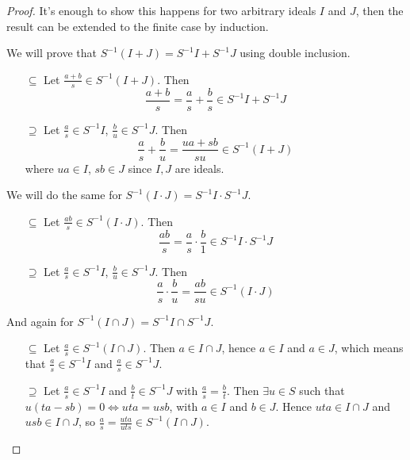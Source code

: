 \begin{exercise}
\begin{enumerate}
    \begin{proof}
    It's enough to show this happens for two arbitrary ideals \(I\) and \(J\), then the result can be extended to the finite case by induction.
    
    We will prove that \(S^{-1} (I + J) = S^{-1} I + S^{-1} J\) using double inclusion.
    \begin{itemize}
        \item[\(\subseteq\)] Let \(\frac{a + b}{s} \in S^{-1}(I + J)\). Then
        \[
            \frac{a + b}{s} = \frac{a}{s} + \frac{b}{s} \in S^{-1} I + S^{-1} J
        \]
        
        \item[\(\supseteq\)] Let \(\frac{a}{s} \in S^{-1} I\), \(\frac{b}{u} \in S^{-1} J\). Then
        \[
            \frac{a}{s} + \frac{b}{u} = \frac{u a + s b}{s u} \in S^{-1} (I + J)
        \]
        where \(ua \in I\), \(sb \in J\) since \(I, J\) are ideals.
    \end{itemize}
    
    We will do the same for \(S^{-1} (I \cdot J) = S^{-1} I \cdot S^{-1} J\).
    \begin{itemize}
        \item[\(\subseteq\)] Let \(\frac{ab}{s} \in S^{-1} (I \cdot J)\). Then
        \[
            \frac{ab}{s} = \frac{a}{s} \cdot \frac{b}{1} \in S^{-1} I \cdot S^{-1} J
        \]
        
        \item[\(\supseteq\)] Let \(\frac{a}{s} \in S^{-1} I\), \(\frac{b}{u} \in S^{-1} J\). Then
        \[
            \frac{a}{s} \cdot \frac{b}{u} = \frac{ab}{su} \in S^{-1} (I \cdot J)
        \]
    \end{itemize}
    
    And again for \(S^{-1} (I \cap J) = S^{-1} I \cap S^{-1} J\).
    \begin{itemize}
        \item[\(\subseteq\)] Let \(\frac{a}{s} \in S^{-1} (I \cap J)\). Then \(a \in I \cap J\), hence \(a \in I\) and \(a \in J\), which means that \(\frac{a}{s} \in S^{-1} I\) and \(\frac{a}{s} \in S^{-1} J\).
        
        \item[\(\supseteq\)] Let \(\frac{a}{s} \in S^{-1} I\) and \(\frac{b}{t} \in S^{-1} J\) with \(\frac{a}{s} = \frac{b}{t}\). Then \(\exists u \in S\) such that \(u(ta - sb) = 0 \iff uta = usb\), with \(a \in I\) and \(b \in J\). Hence \(uta \in I \cap J\) and \(usb \in I \cap J\), so \(\frac{a}{s} = \frac{uta}{uts} \in S^{-1} (I \cap J)\).
    \end{itemize}
    

\end{proof}
\end{enumerate}
\end{exercise}
